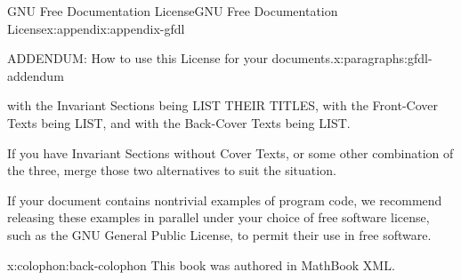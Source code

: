 \documentclass[oneside,10pt,]{book}
\newcommand{\xreffont}{\relax}
\numberwithin{equation}{section}
\begin{document}
\begin{appendixptx}{GNU Free Documentation License}{}{GNU Free Documentation License}{}{}{x:appendix:appendix-gfdl}
\begin{paragraphs}{ADDENDUM: How to use this License for your documents.}{x:paragraphs:gfdl-addendum}
\begin{preformatted}
with the Invariant Sections being LIST THEIR TITLES, with
       the Front-Cover Texts being LIST, and with the Back-Cover Texts
       being LIST.
\end{preformatted}
If you have Invariant Sections without Cover Texts, or some other combination of the three, merge those two alternatives to suit the situation.%
\par
If your document contains nontrivial examples of program code, we recommend releasing these examples in parallel under your choice of free software license, such as the GNU General Public License, to permit their use in free software.%
\end{paragraphs}%
\end{appendixptx}
%
\backmatter
%
%
{\xreffont\printindex}
%
\cleardoublepage
\pagestyle{empty}
\begin{backcolophon}{x:colophon:back-colophon}%
This book was authored in MathBook XML.%
\end{backcolophon}%
\cleardoublepage%
%
\end{document}
